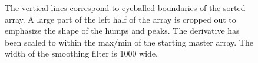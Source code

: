 \documentclass[10pt]{scrartcl}
\begin{document}
\begin{figure}[!ht]
    {\caption{The vertical lines correspond to eyeballed boundaries of the sorted array. A large part of the left half of the array is cropped out to emphasize the shape of the humps and peaks. The derivative has been scaled to within the max/min of the starting master array. The width of the smoothing filter is 1000 wide.}\label{comps}}%
\end{figure}

   
\end{document}

